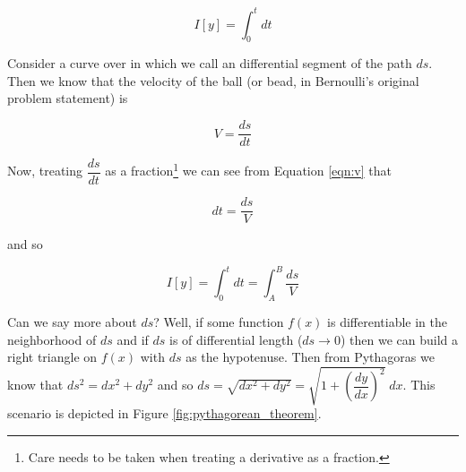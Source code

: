 \documentclass{article}
\theoremstyle{definition}
\begin{document}
\begin{equation*}
I[y] = \int_{0}^{t} dt
\end{equation*}

\bigskip
\noindent
Consider a curve over in which we call an differential segment of the path $ds$. Then
we know that the velocity of the ball (or bead, in Bernoulli's original problem statement) 
is

\begin{equation}
V = \dfrac{ds}{dt}
\label{eqn:v}
\end{equation}

\bigskip
\noindent
Now, treating $\dfrac{ds}{dt}$ as a fraction\footnote{Care needs to be taken when 
treating a derivative as a fraction.} we can see from Equation \ref{eqn:v} that

\bigskip
\begin{equation*}
dt = \dfrac{ds}{V}
\end{equation*}

\bigskip
\noindent
and so 

\begin{equation}
I[y] = \int_{0}^{t} dt = \int_A^B \dfrac{ds}{V}
\label{eqn:I}
\end{equation}


\bigskip
{ 
\noindent
Can we say more about $ds$? Well, if some function
$f(x)$ is differentiable in the neighborhood of $ds$ 
and if $ds$ is of differential length ($ds \to 0$) 
then we can build a right triangle on $f(x)$ with 
$ds$ as the hypotenuse. Then from Pythagoras we 
know that $ds^2 = dx^2 + dy^2$ and so 
$ds = \sqrt{dx^2 + dy^2} = \sqrt{1 + \left ( \dfrac{dy}{dx} \right )^2} \; dx$. 
This scenario is depicted in Figure \ref{fig:pythagorean_theorem}.
\par}
\end{document}
